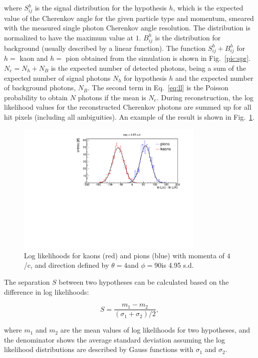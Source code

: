 \noindent where $S^{h}_{ij}$ is the signal distribution for the hypothesis $h$, which is the expected value of the Cherenkov angle for the given particle type and momentum, smeared with the measured single photon Cherenkov angle resolution. The distribution is normalized to have the maximum value at $1$. $B^{h}_{ij}$ is the distribution for background (usually described by a linear function). The function $S^{h}_{ij} + B^{h}_{ij}$ for $h = $ kaon and $h = $ pion obtained from the simulation is shown in Fig.~\ref{pic:spr}. $N_{e} = N_{h} + N_{B}$ is the expected number of detected photons, being a sum of the expected number of signal photons $N_{h}$ for hypothesis $h$ and the expected number of background photons, $N_{B}$. The second term in Eq.~\ref{eq:ll} is the Poisson probability to obtain $N$ photons if the mean is $N_{e}$.
During reconstruction, the log likelihood values for the reconstructed Cherenkov photons are summed up for all hit pixels (including all ambiguities). An example of the result is shown in Fig.~\ref{pic:sepLUT}.

\begin{figure}[!h]
\centering
\includegraphics[clip, trim=0cm 0cm 0cm 0.7cm, width=0.8\textwidth]{pics/hLnDiff.pdf}
\caption{\label{pic:sepLUT}
Log likelihoods for kaons (red) and pions (blue) with momenta of $4$ {\gev}/c, and direction defined by $\theta = 4$\mydeg and $\phi = 90$\mydeg is 4.95 s.d.
}
\end{figure}

The separation $S$ between two hypotheses can be calculated based on the difference in log likelihoods:

\begin{equation}
S = \frac{m_{1}-m_{2}}{(\sigma_{1} + \sigma_{2})/2},
\end{equation}

\noindent where $m_{1}$ and $m_{2}$ are the mean values of log likelihoods for two hypotheses, and the denominator shows the average standard deviation assuming the log likelihood distributions are described by Gauss functions with $\sigma_{1}$ and $\sigma_{2}$.
